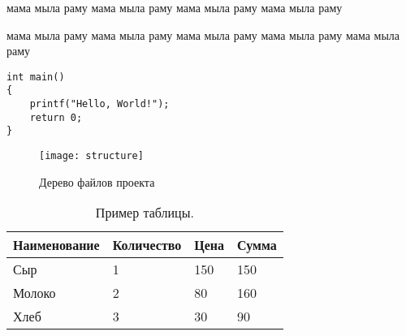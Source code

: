 \begin{center}
\WorkType

\Topic
\end{center}

мама мыла раму
мама мыла раму
мама мыла раму
мама мыла раму

                   мама                      мыла раму
мама мыла раму
										мама мыла раму
мама 					мыла раму
мама мыла раму



\begin{lstlisting}[style=cpp,caption={Листинг программы}]
int main()
{
    printf("Hello, World!");
    return 0;
}
\end{lstlisting}


\begin{figure}[H]
\centering
\texttt{[image: structure]}
\caption{Дерево файлов проекта}
\label{fig:structure2}
\end{figure}

\begin{table}[H]
\centering
\caption{Пример таблицы.}
\begin{tabular}{|l|l|l|l|}
\hline
Наименование & Количество & Цена & Сумма \\ \hline
Сыр          & 1          & 150  & 150   \\ \hline
Молоко       & 2          & 80   & 160   \\ \hline
Хлеб         & 3          & 30   & 90    \\ \hline
\end{tabular}
\end{table}
